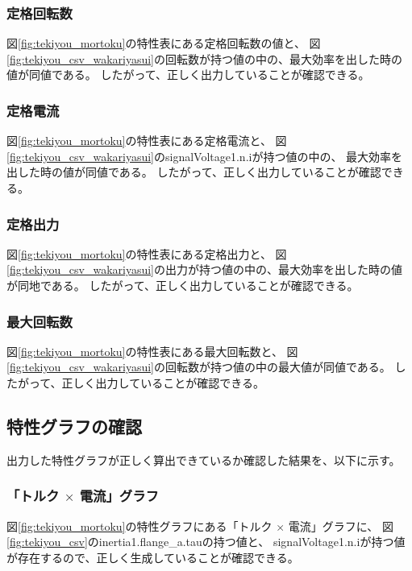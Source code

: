 \subsubsection{定格回転数}
図\ref{fig:tekiyou_mortoku}の特性表にある定格回転数の値と、
図\ref{fig:tekiyou_csv_wakariyasui}の回転数が持つ値の中の、最大効率を出した時の値が同値である。
したがって、正しく出力していることが確認できる。

\subsubsection{定格電流}
図\ref{fig:tekiyou_mortoku}の特性表にある定格電流と、
図\ref{fig:tekiyou_csv_wakariyasui}のsignalVoltage1.n.iが持つ値の中の、
最大効率を出した時の値が同値である。
したがって、正しく出力していることが確認できる。

\subsubsection{定格出力}
図\ref{fig:tekiyou_mortoku}の特性表にある定格出力と、
図\ref{fig:tekiyou_csv_wakariyasui}の出力が持つ値の中の、最大効率を出した時の値が同地である。
したがって、正しく出力していることが確認できる。

\subsubsection{最大回転数}
図\ref{fig:tekiyou_mortoku}の特性表にある最大回転数と、
図\ref{fig:tekiyou_csv_wakariyasui}の回転数が持つ値の中の最大値が同値である。
したがって、正しく出力していることが確認できる。

\subsection{特性グラフの確認}
出力した特性グラフが正しく算出できているか確認した結果を、以下に示す。

\subsubsection{「トルク $\times$ 電流」グラフ}
図\ref{fig:tekiyou_mortoku}の特性グラフにある「トルク $\times$ 電流」グラフに、
図\ref{fig:tekiyou_csv}のinertia1.flange\_a.tauの持つ値と、
signalVoltage1.n.iが持つ値が存在するので、正しく生成していることが確認できる。

